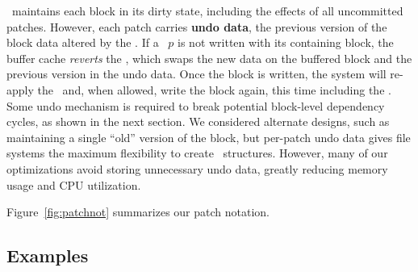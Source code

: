 %
\Featherstitch\ maintains each block in its dirty state, including the
 effects of all uncommitted patches.
%
However, each patch carries \textbf{undo data}, the 
 previous version of the block data altered by the \patch.
%
If a \patch\ $p$ is not written with its containing block, the buffer cache
 \emph{reverts} the \patch, which swaps the new data on the buffered block
 and the previous version in the undo data.
%
Once the block is written, the system will re-apply the \patch\ and, when
 allowed, write the block again, this time including the \patch.
%
Some undo mechanism is required to break potential block-level dependency cycles, as
 shown in the next section.
%
We considered alternate designs, such as maintaining a single ``old''
 version of the block, but per-patch undo data gives file systems the
 maximum flexibility to create \patch\ structures.
%
However, many of our optimizations avoid storing unnecessary undo data, greatly
 reducing memory usage and CPU utilization.

Figure~\ref{fig:patchnot} summarizes our patch notation.

\label{sec:patch:dependencies}

\begin{comment}
\paragraph{Example}
%
Suppose a \Kudos\ system contains the \patches\ in Figure~\ref{f:ex}c,
where the journal entry patches $d_\textrm{J}$, $i_\textrm{J}$, and
 $b_\textrm{J}$ have committed and all other patches have not.
%
The buffer cache cannot write blocks $\PBlock{b}$, $\PBlock{i}$, or $\PBlock{d}$,
since $\{b$, $i$, $i'$, $d\} \PDDepend \PXcmt$ and $\PXcmt \not\in \PDisk$.
%
Its only option is to write $\PBlock{\PXcmt}$ with $P = \{\PXcmt\}$, since
 $\PDepset{\PXcmt} = \{d_\textrm{J}$, $i_\textrm{J}$, $b_\textrm{J}\}
 \subseteq \PDisk$.
%
Since $\PXcmp$ has unmet dependencies on other blocks, it must be undone
 before the write and is excluded from $P$.
%
Later, when $\PXcmt$ commits, the buffer cache has the option to
write any of $\PBlock{b}$, $\PBlock{i}$, or $\PBlock{d}$.
\end{comment}


\subsection{Examples}
\label{sec:patch:examples}

